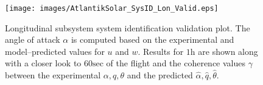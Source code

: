 %
\begin{figure}[htbp]
\centering
  \texttt{[image: images/AtlantikSolar\_SysID\_Lon\_Valid.eps]}
\caption{Longitudinal subsystem system identification validation plot. The angle of attack $\alpha$ is computed based on the experimental and model--predicted values for $u$ and $w$. Results for $1\textrm{h}$ are shown along with a closer look to $60\textrm{sec}$ of the flight and the coherence values $\gamma$ between the experimental $\alpha,q,\theta$ and the predicted $\hat{\alpha},\hat{q},\hat{\theta}$. }
\label{SysID_LonValid}
\end{figure}
% 